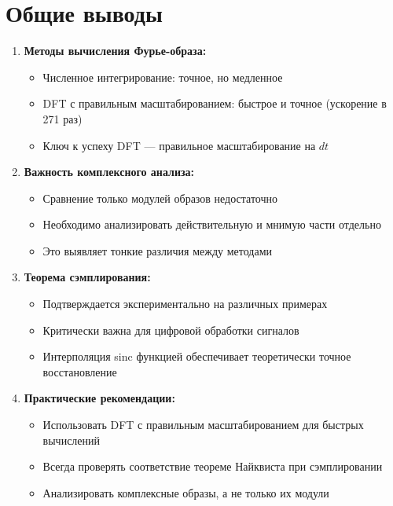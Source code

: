 \section*{Общие выводы}

\begin{enumerate}
    \item \textbf{Методы вычисления Фурье-образа:}
    \begin{itemize}
        \item Численное интегрирование: точное, но медленное
        \item DFT с правильным масштабированием: быстрое и точное (ускорение в 271 раз)
        \item Ключ к успеху DFT — правильное масштабирование на $dt$
    \end{itemize}
    
    \item \textbf{Важность комплексного анализа:}
    \begin{itemize}
        \item Сравнение только модулей образов недостаточно
        \item Необходимо анализировать действительную и мнимую части отдельно
        \item Это выявляет тонкие различия между методами
    \end{itemize}
    
    \item \textbf{Теорема сэмплирования:}
    \begin{itemize}
        \item Подтверждается экспериментально на различных примерах
        \item Критически важна для цифровой обработки сигналов
        \item Интерполяция sinc функцией обеспечивает теоретически точное восстановление
    \end{itemize}
    
    \item \textbf{Практические рекомендации:}
    \begin{itemize}
        \item Использовать DFT с правильным масштабированием для быстрых вычислений
        \item Всегда проверять соответствие теореме Найквиста при сэмплировании
        \item Анализировать комплексные образы, а не только их модули
    \end{itemize}
\end{enumerate}